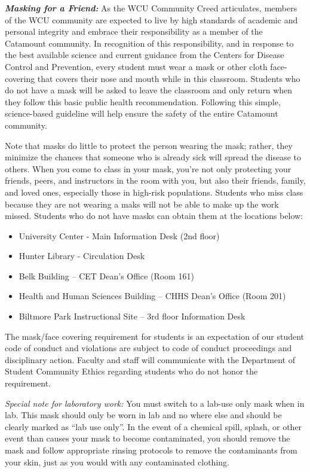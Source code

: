 \documentclass[]{tufte-book}
\providecommand{\tightlist}{%
  \setlength{\itemsep}{0pt}\setlength{\parskip}{0pt}}
\begin{document}
\textbf{\emph{Masking for a Friend:}} As the WCU Community Creed articulates, members of the WCU community are expected to live by high standards of academic and personal integrity and embrace their responsibility as a member of the Catamount community. In recognition of this responsibility, and in response to the best available science and current guidance from the Centers for Disease Control and Prevention, every student must wear a mask or other cloth face-covering that covers their nose and mouth while in this classroom. Students who do not have a mask will be asked to leave the classroom and only return when they follow this basic public health recommendation. Following this simple, science-based guideline will help ensure the safety of the entire Catamount community.

Note that masks do little to protect the person wearing the mask; rather, they minimize the chances that someone who is already sick will spread the disease to others. When you come to class in your mask, you're not only protecting your friends, peers, and instructors in the room with you, but also their friends, family, and loved ones, especially those in high-risk populations. Students who miss class because they are not wearing a maks will not be able to make up the work missed. Students who do not have masks can obtain them at the locations below:

\begin{itemize}
\tightlist
\item
  University Center - Main Information Desk (2nd floor)
\item
  Hunter Library - Circulation Desk
\item
  Belk Building -- CET Dean's Office (Room 161)
\item
  Health and Human Sciences Building -- CHHS Dean's Office (Room 201)
\item
  Biltmore Park Instructional Site -- 3rd floor Information Desk
\end{itemize}

The mask/face covering requirement for students is an expectation of our student code of conduct and violations are subject to code of conduct proceedings and disciplinary action. Faculty and staff will communicate with the Department of Student Community Ethics regarding students who do not honor the requirement.

\emph{Special note for laboratory work:} You must switch to a lab-use only mask when in lab. This mask should only be worn in lab and no where else and should be clearly marked as ``lab use only''. In the event of a chemical spill, splash, or other event than causes your mask to become contaminated, you should remove the mask and follow appropriate rinsing protocols to remove the contaminants from your skin, just as you would with any contaminated clothing.
\end{document}
